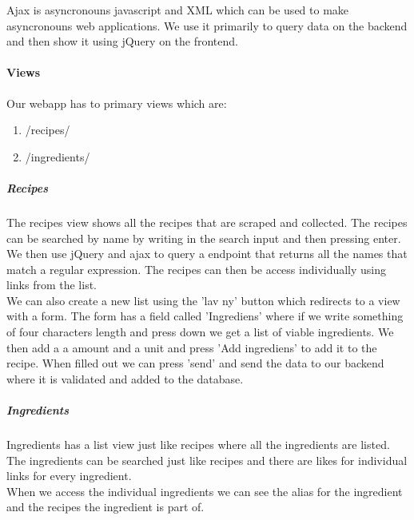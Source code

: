 \documentclass{article}
\begin{document}
Ajax is asyncronouns javascript and XML which can be used to make asyncronouns
web applications. We use it primarily to query data on the backend and then show
it using jQuery on the frontend.

\paragraph{Views}
Our webapp has to primary views which are:
\begin{enumerate}
	\item /recipes/
	\item /ingredients/
\end{enumerate}
\subparagraph{Recipes}
The recipes view shows all the recipes that are scraped and collected. The
recipes can be searched by name by writing in the search input and then pressing
enter. We then use jQuery and ajax to query a endpoint that returns all the
names that match a regular expression. The recipes can then be access
individually using links from the list.\\

We can also create a new list using the 'lav ny' button which redirects to a
view with a form. The form has a field called 'Ingrediens' where if we write
something of four characters length and press down we get a list of viable
ingredients. We then add a a amount and a unit and press 'Add ingrediens' to add
it to the recipe. When filled out we can press 'send' and send the data to our
backend where it is validated and added to the database.

\subparagraph{Ingredients}
Ingredients has a list view just like recipes where all the ingredients are
listed. The ingredients can be searched just like recipes and there are likes
for individual links for every ingredient.\\

When we access the individual ingredients we can see the alias for the
ingredient and the recipes the ingredient is part of. 
\end{document}
